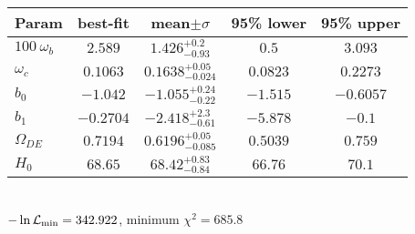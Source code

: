 \begin{tabular}{|l|c|c|c|c|} 
 \hline 
Param & best-fit & mean$\pm\sigma$ & 95\% lower & 95\% upper \\ \hline 
$100~\omega_{b }$ &$2.589$ & $1.426_{-0.93}^{+0.2}$ & $0.5$ & $3.093$ \\ 
$\omega_c$ &$0.1063$ & $0.1638_{-0.024}^{+0.05}$ & $0.0823$ & $0.2273$ \\ 
$b_{0 }$ &$-1.042$ & $-1.055_{-0.22}^{+0.24}$ & $-1.515$ & $-0.6057$ \\ 
$b_{1 }$ &$-0.2704$ & $-2.418_{-0.61}^{+2.3}$ & $-5.878$ & $-0.1$ \\ 
$\Omega_{DE}$ &$0.7194$ & $0.6196_{-0.085}^{+0.05}$ & $0.5039$ & $0.759$ \\ 
$H_{0 }$ &$68.65$ & $68.42_{-0.84}^{+0.83}$ & $66.76$ & $70.1$ \\ 
\hline 
 \end{tabular} \\ 
$-\ln{\cal L}_\mathrm{min} =342.922$, minimum $\chi^2=685.8$ \\ 
